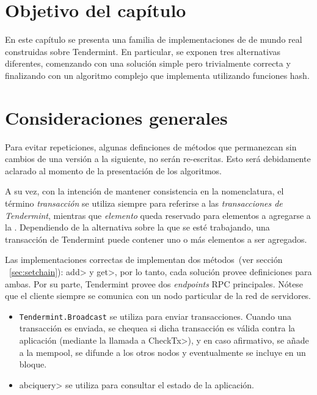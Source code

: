 \section{Objetivo del capítulo}

En este capítulo se presenta una familia de implementaciones de \setchain de mundo
real construidas sobre Tendermint.
%
En particular, se exponen tres alternativas diferentes, comenzando con una
solución simple pero trivialmente correcta y finalizando con un algoritmo
complejo que implementa \setchain utilizando funciones hash.
%

\section{Consideraciones generales}\label{sec:impl}
Para evitar repeticiones, algunas definciones de métodos que permanezcan sin cambios
de una versión a la siguiente, no serán re-escritas.
Esto será debidamente aclarado al momento de la presentación de los algoritmos.

%
A su vez, con la intención de mantener consistencia en la nomenclatura,
el término \textit{transacción} se utiliza siempre para referirse a las
\textit{transacciones de Tendermint}, mientras
que \textit{elemento} queda reservado para elementos a agregarse a la \setchain.
%
Dependiendo de la alternativa sobre la que se esté trabajando, una transacción de
Tendermint puede contener uno o más elementos a ser agregados.
%

Las implementaciones correctas de \setchain implementan dos métodos~(ver sección
~\ref{sec:setchain}): \<add> y \<get>, por lo tanto, cada solución provee definiciones
para ambas.
%
Por su parte, Tendermint provee dos \textit{endpoints} RPC principales.
Nótese que el cliente siempre se comunica con un nodo particular de la red de servidores.
\begin{itemize}
  \item \texttt{Tendermint.Broadcast} se utiliza para enviar transacciones.
  Cuando una transacción es enviada, se chequea si dicha transacción
  es válida contra la aplicación (mediante la llamada a \<CheckTx>), y en caso
  afirmativo, se añade
  a la mempool, se difunde a los otros nodos y eventualmente se incluye en
  un bloque.
  \item \<abciquery> se utiliza para consultar el estado de la
  aplicación.
\end{itemize}
%

